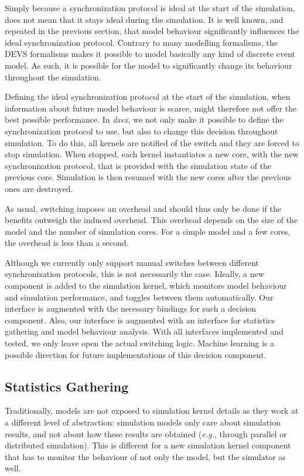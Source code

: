 Simply because a synchronization protocol is ideal at the start of the simulation, does not mean that it stays ideal during the simulation.
It is well known, and repeated in the previous section, that model behaviour significantly influences the ideal synchronization protocol.
Contrary to many modelling formalisms, the \textsf{DEVS} formalisms makes it possible to model basically any kind of discrete event model.
As such, it is possible for the model to significantly change its behaviour throughout the simulation.

Defining the ideal synchronization protocol at the start of the simulation, when information about future model behaviour is scarce, might therefore not offer the best possible performance.
In \textit{dxex}, we not only make it possible to define the synchronization protocol to use, but also to change this decision throughout simulation.
To do this, all kernels are notified of the switch and they are forced to stop simulation.
When stopped, each kernel instantiates a new core, with the new synchronization protocol, that is provided with the simulation state of the previous core.
Simulation is then resumed with the new cores after the previous ones are destroyed.

As usual, switching imposes an overhead and should thus only be done if the benefits outweigh the induced overhead.
This overhead depends on the size of the model and the number of simulation cores.
For a simple model and a few cores, the overhead is less than a second.

Although we currently only support manual switches between different synchronization protocols, this is not necessarily the case.
Ideally, a new component is added to the simulation kernel, which monitors model behaviour and simulation performance, and toggles between them automatically.
Our interface is augmented with the necessary bindings for such a decision component.
Also, our interface is augmented with an interface for statistics gathering and model behaviour analysis.
With all interfaces implemented and tested, we only leave open the actual switching logic.
Machine learning is a possible direction for future implementations of this decision component.

\subsection{Statistics Gathering}
Traditionally, models are not exposed to simulation kernel details as they work at a different level of abstraction:
simulation models only care about simulation results, and not about how these results are obtained (\textit{e.g.}, through parallel or distributed simulation).
This is different for a new simulation kernel component that has to monitor the behaviour of not only the model, but the simulator as well.

